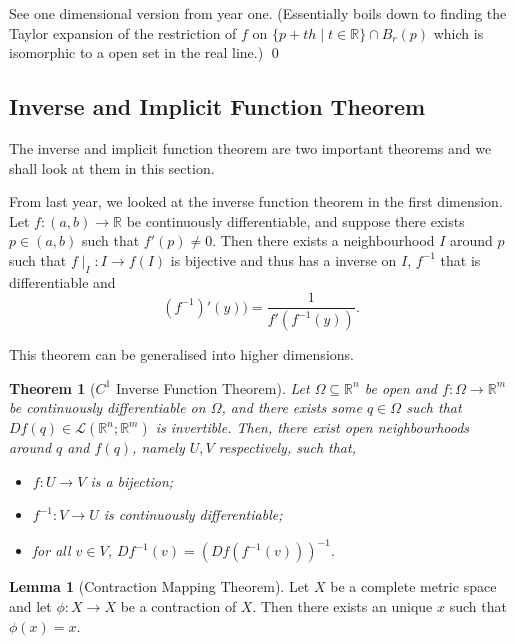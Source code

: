 \documentclass[
]{article}
\newtheorem{theorem}{Theorem}
\theoremstyle{definition}
\newtheorem{lemma}{Lemma}[section]
\begin{document}
See one dimensional version from year one. (Essentially boils down to
finding the Taylor expansion of the restriction of \(f\) on
\(\{p + th \mid t \in \mathbb{R}\} \cap B_r(p)\) which is isomorphic to
a open set in the real line.) \qed

\hypertarget{inverse-and-implicit-function-theorem}{%
\subsection{Inverse and Implicit Function
Theorem}\label{inverse-and-implicit-function-theorem}}

The inverse and implicit function theorem are two important theorems and
we shall look at them in this section.

From last year, we looked at the inverse function theorem in the first
dimension. Let \(f : (a, b) \to \mathbb{R}\) be continuously
differentiable, and suppose there exists \(p \in (a, b)\) such that
\(f'(p) \neq 0\). Then there exists a neighbourhood \(I\) around \(p\)
such that \(f \mid_I : I \to f(I)\) is bijective and thus has a inverse
on \(I\), \(f^{-1}\) that is differentiable and
\[(f^{-1})'(y)) = \frac{1}{f'(f^{-1}(y))}.\]

This theorem can be generalised into higher dimensions.

\begin{theorem}[\(C^1\) Inverse Function Theorem]
  Let \(\Omega \subseteq \mathbb{R}^n\) be open and \(f : \Omega \to \mathbb{R}^m\) 
  be continuously differentiable on \(\Omega\), and there exists some \(q \in \Omega\) 
  such that \(Df(q) \in \mathcal{L}(\mathbb{R}^n; \mathbb{R}^m)\) is invertible.
  Then, there exist open neighbourhoods around \(q\) and \(f(q)\), namely \(U, V\)
  respectively, such that,
  \begin{itemize}
    \item \(f : U \to V\) is a bijection;
    \item \(f^{-1} : V \to U\) is continuously differentiable;
    \item for all \(v \in V\), \(Df^{-1}(v) = (Df(f^{-1}(v)))^{-1}\).
  \end{itemize}
\end{theorem}

\begin{lemma}[Contraction Mapping Theorem]
  Let \(X\) be a complete metric space and let \(\phi : X \to X\) be a contraction 
  of \(X\). Then there exists an unique \(x\) such that \(\phi(x) = x\).
\end{lemma}
\end{document}
